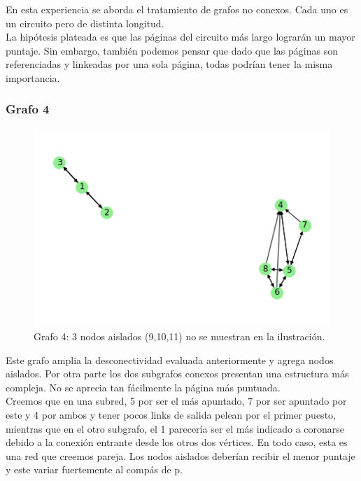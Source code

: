 En esta experiencia se aborda el tratamiento de grafos no conexos. Cada uno es un circuito pero de distinta longitud. \\

La hipótesis plateada es que las páginas del circuito más largo lograrán un mayor puntaje. Sin embargo, también podemos pensar que dado que las páginas son referenciadas y linkeadas por una sola página, todas podrían tener la misma importancia. \\

\subsubsection{Grafo 4}

\begin{figure}[H]
   \begin{center}
     \includegraphics{img/prueba_aislado.png} 
  \end{center}
\caption{Grafo 4: 3 nodos aislados (9,10,11) no se muestran en la ilustración.} \label{fig:exp3-aislado}
\end{figure}

Este grafo amplia la desconectividad evaluada anteriormente y agrega nodos aislados. Por otra parte los dos subgrafos conexos presentan una estructura más compleja. No se aprecia tan fácilmente la página más puntuada.\\

Creemos que en una subred, 5 por ser el más apuntado, 7 por ser apuntado por este y 4 por ambos y tener pocos links de salida pelean por el primer puesto, mientras que en el otro subgrafo, el 1 parecería ser el más indicado a coronarse debido a la conexión entrante desde los otros dos vértices. En todo caso, esta es una red que creemos pareja.
Los nodos aislados deberían recibir el menor puntaje y este variar fuertemente al compás de p. \\


